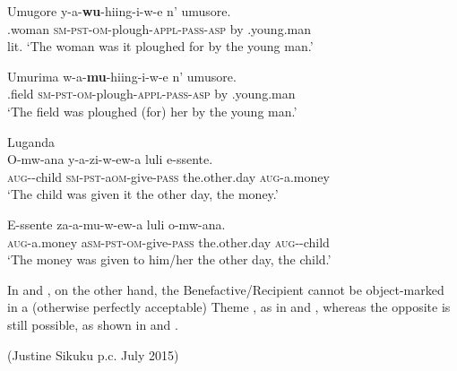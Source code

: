 \documentclass[output=paper]{LSP/langsci}
\begin{document}
 \ex\label{ex:vanderwal:43b}
\gll Umugore  y-a-\textbf{wu}{}-hiing-i-w-e  n’  umusore.\\
    .woman  \textsc{sm-pst-om}{}-plough-\textsc{appl-pass-asp}  by  .young.man\\
    \glt lit. ‘The woman was it ploughed for by the young man.’

 \ex\label{ex:vanderwal:43c}
\gll Umurima  w-a-\textbf{mu}{}-hiing-i-w-e  n’  umusore.\\
    .field  \textsc{sm-pst-om-}plough-\textsc{appl-pass-asp}  by  .young.man\\
    \glt ‘The field was ploughed (for) her by the young man.’
\z
\z


\ea\label{ex:vanderwal:44}
Luganda \citep{Ranero2015}\\

 
 \ea\label{ex:vanderwal:44b}\label{ex:vanderwal:44aa}
\gll O-mw-ana  y-a-zi-w-ew-a  luli  e-ssente.\\
    \textsc{aug}{}--child  \textsc{sm}{}-\textsc{pst}{}-a\textsc{om}{}-give-\textsc{pass} the.other.day  \textsc{aug}{}-a.money\\
    \glt ‘The child was given it the other day, the money.’
 
 \ex \label{ex:vanderwal:44a}\label{ex:vanderwal:44bb}
\gll E-ssente   za-a-mu-w-ew-a   luli   o-mw-ana.\\
    \textsc{aug}{}-a.money  a\textsc{sm}{}-\textsc{pst}{}-\textsc{om}{}-give-\textsc{pass} the.other.day  \textsc{aug-}-child\\
    \glt ‘The money was given to him/her the other day, the child.’
\z
\z


In  and , on the other hand, the Benefactive/Recipient cannot be object-marked in a (otherwise perfectly acceptable) Theme , as in  and , whereas the opposite is still possible, as shown in  and .

\newpage 

\ea\label{ex:vanderwal:45}%
 (Justine Sikuku p.c. July 2015)\\
\end{document}
